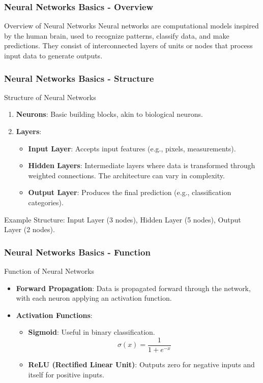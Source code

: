 \documentclass[aspectratio=169]{beamer}
\begin{document}
\begin{frame}[fragile]
    \frametitle{Neural Networks Basics - Overview}
    \begin{block}{Overview of Neural Networks}
        Neural networks are computational models inspired by the human brain, used to recognize patterns, classify data, and make predictions. 
        They consist of interconnected layers of units or nodes that process input data to generate outputs.
    \end{block}
\end{frame}

\begin{frame}[fragile]
    \frametitle{Neural Networks Basics - Structure}
    \begin{block}{Structure of Neural Networks}
        \begin{enumerate}
            \item \textbf{Neurons}: Basic building blocks, akin to biological neurons.
            \item \textbf{Layers}:
            \begin{itemize}
                \item \textbf{Input Layer}: Accepts input features (e.g., pixels, measurements).
                \item \textbf{Hidden Layers}: Intermediate layers where data is transformed through weighted connections. The architecture can vary in complexity.
                \item \textbf{Output Layer}: Produces the final prediction (e.g., classification categories).
            \end{itemize}
        \end{enumerate}
        \pause
        Example Structure: Input Layer (3 nodes), Hidden Layer (5 nodes), Output Layer (2 nodes).
    \end{block}
\end{frame}

\begin{frame}[fragile]
    \frametitle{Neural Networks Basics - Function}
    \begin{block}{Function of Neural Networks}
        \begin{itemize}
            \item \textbf{Forward Propagation}: Data is propagated forward through the network, with each neuron applying an activation function.
            \item \textbf{Activation Functions}:
            \begin{itemize}
                \item \textbf{Sigmoid}: Useful in binary classification.
                \[
                \sigma(x) = \frac{1}{1 + e^{-x}} 
                \]
                \item \textbf{ReLU (Rectified Linear Unit)}: Outputs zero for negative inputs and itself for positive inputs.
            \end{itemize}
        \end{itemize}
    \end{block}
\end{frame}
\end{document}
